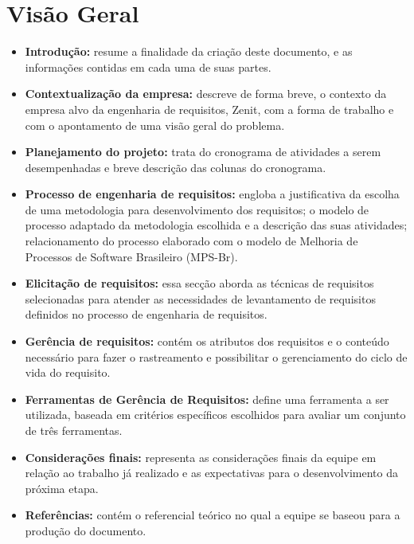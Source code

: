 \section{Visão Geral}
\begin{itemize}
\item \textbf{Introdução:} 
resume a finalidade da criação deste documento, e as informações contidas em cada uma de suas partes.
\item \textbf{Contextualização da empresa:} 
descreve de forma breve, o contexto da empresa alvo da engenharia de requisitos, Zenit, com a forma de trabalho e com o apontamento de uma visão geral do problema.
\item \textbf{Planejamento do projeto:} 
trata do cronograma de atividades a serem desempenhadas e breve descrição das colunas do cronograma.
\item \textbf{Processo de engenharia de requisitos:} 
engloba a justificativa da escolha de uma metodologia para desenvolvimento dos requisitos; o modelo de processo adaptado da metodologia escolhida e a descrição das suas atividades; relacionamento do processo elaborado com o modelo de Melhoria de Processos de Software Brasileiro (MPS-Br).
\item \textbf{Elicitação de requisitos:} 
essa secção aborda as técnicas de requisitos selecionadas para atender as necessidades de levantamento de requisitos definidos no processo de engenharia de requisitos.
\item \textbf{Gerência de requisitos:} 
contém os atributos dos requisitos e o conteúdo necessário para fazer o rastreamento e possibilitar o gerenciamento do ciclo de vida do requisito.
\item \textbf{Ferramentas de Gerência de Requisitos:} 
define uma ferramenta a ser utilizada, baseada em critérios específicos escolhidos para avaliar um conjunto de três ferramentas.
\item \textbf{Considerações finais:} 
representa as considerações finais da equipe em relação ao trabalho já realizado e as expectativas para o desenvolvimento da próxima etapa.
\item \textbf{Referências:} 
contém o referencial teórico no qual a equipe se baseou para a produção do documento.
\end{itemize}
